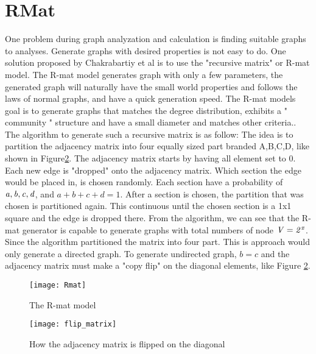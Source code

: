 {\section{RMat}
One problem during graph analyzation and calculation is finding suitable graphs to analyses. Generate graphs with desired properties is not easy to do. One solution proposed by Chakrabartiy et al is to use the "recursive matrix" or R-mat model. The R-mat model generates graph with only a few parameters, the generated graph will naturally have the small world properties and follows the laws of normal graphs, and have a quick generation speed\cite{Rmat2004}. The R-mat models goal is to generate graphs that matches the degree distribution, exhibits a " community " structure and have a small diameter and matches other criteria.\cite{Rmat2004}. The algorithm to generate such a recursive matrix is as follow: The idea is to partition the adjacency matrix into four equally sized part branded A,B,C,D, like shown in Figure\ref{fig:flipDiagonal}. The adjacency matrix starts by having all element set to 0. Each new edge is "dropped" onto the adjacency matrix. Which section the edge would be placed in, is chosen randomly. Each section have a probability of $\it{a, b, c, d}$, and $a + b + c + d = 1$. After a section is chosen, the partition that was chosen is partitioned again. This continuous until the chosen section is a 1x1 square and the edge is dropped there. From the algorithm, we can see that the R-mat generator is capable to generate graphs with total numbers of node $ \it{V} = 2^x$. Since the algorithm partitioned the matrix into four part. This is approach would only generate a directed graph. To generate undirected graph, $b = c$ and the adjacency matrix must make a "copy flip" on the diagonal elements, like Figure \ref{fig:flipDiagonal}. 


\begin{figure}
\texttt{[image: Rmat]}
\caption{The R-mat model}
\label{fig:Rmat}
\end{figure}

\begin{figure}
\texttt{[image: flip\_matrix]}
\caption{How the adjacency matrix is flipped on the diagonal}
\label{fig:flipDiagonal}

\end{figure}



}
